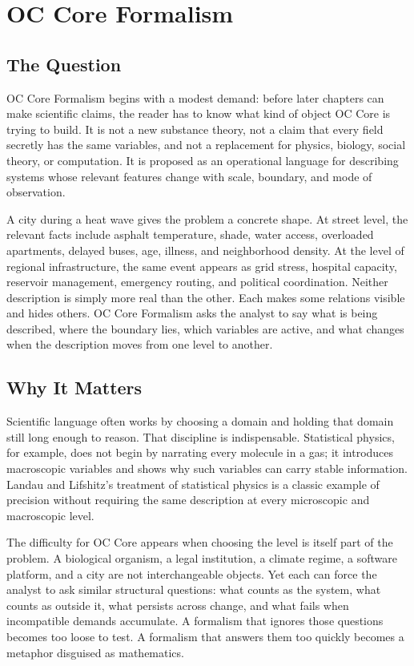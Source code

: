 \documentclass[11pt,a4paper,openany]{book}
\begin{document}
\section{OC Core Formalism}
\subsection{The Question}
OC Core Formalism begins with a modest demand: before later chapters can make scientific claims, the reader has to know what kind of object OC Core is trying to build. It is not a new substance theory, not a claim that every field secretly has the same variables, and not a replacement for physics, biology, social theory, or computation. It is proposed as an operational language for describing systems whose relevant features change with scale, boundary, and mode of observation. \cite{kadanoff_scaling,wilson_renormalization}\par
A city during a heat wave gives the problem a concrete shape. At street level, the relevant facts include asphalt temperature, shade, water access, overloaded apartments, delayed buses, age, illness, and neighborhood density. At the level of regional infrastructure, the same event appears as grid stress, hospital capacity, reservoir management, emergency routing, and political coordination. Neither description is simply more real than the other. Each makes some relations visible and hides others. OC Core Formalism asks the analyst to say what is being described, where the boundary lies, which variables are active, and what changes when the description moves from one level to another.\par
\subsection{Why It Matters}
Scientific language often works by choosing a domain and holding that domain still long enough to reason. That discipline is indispensable. Statistical physics, for example, does not begin by narrating every molecule in a gas; it introduces macroscopic variables and shows why such variables can carry stable information. Landau and Lifshitz's treatment of statistical physics is a classic example of precision without requiring the same description at every microscopic and macroscopic level. \cite{kadanoff_scaling,wilson_renormalization}\par
The difficulty for OC Core appears when choosing the level is itself part of the problem. A biological organism, a legal institution, a climate regime, a software platform, and a city are not interchangeable objects. Yet each can force the analyst to ask similar structural questions: what counts as the system, what counts as outside it, what persists across change, and what fails when incompatible demands accumulate. A formalism that ignores those questions becomes too loose to test. A formalism that answers them too quickly becomes a metaphor disguised as mathematics.\par
\end{document}
